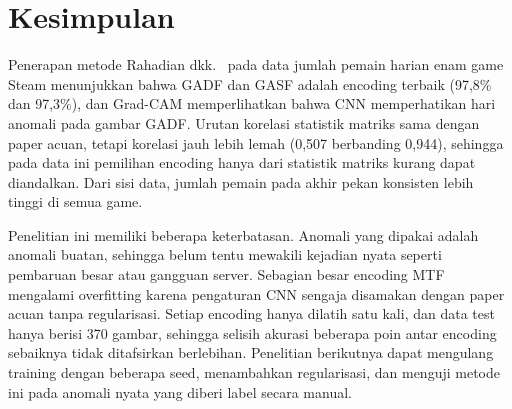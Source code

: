 \section{Kesimpulan}

Penerapan metode Rahadian dkk.~\cite{rahadian2023} pada data jumlah pemain harian enam game Steam menunjukkan bahwa GADF dan GASF adalah encoding terbaik (97,8\% dan 97,3\%), dan Grad-CAM memperlihatkan bahwa CNN memperhatikan hari anomali pada gambar GADF. Urutan korelasi statistik matriks sama dengan paper acuan, tetapi korelasi \dsd{} jauh lebih lemah (0,507 berbanding 0,944), sehingga pada data ini pemilihan encoding hanya dari statistik matriks kurang dapat diandalkan. Dari sisi data, jumlah pemain pada akhir pekan konsisten lebih tinggi di semua game.

Penelitian ini memiliki beberapa keterbatasan. Anomali yang dipakai adalah anomali buatan, sehingga belum tentu mewakili kejadian nyata seperti pembaruan besar atau gangguan server. Sebagian besar encoding MTF mengalami overfitting karena pengaturan CNN sengaja disamakan dengan paper acuan tanpa regularisasi. Setiap encoding hanya dilatih satu kali, dan data test hanya berisi 370 gambar, sehingga selisih akurasi beberapa poin antar encoding sebaiknya tidak ditafsirkan berlebihan. Penelitian berikutnya dapat mengulang training dengan beberapa seed, menambahkan regularisasi, dan menguji metode ini pada anomali nyata yang diberi label secara manual.
